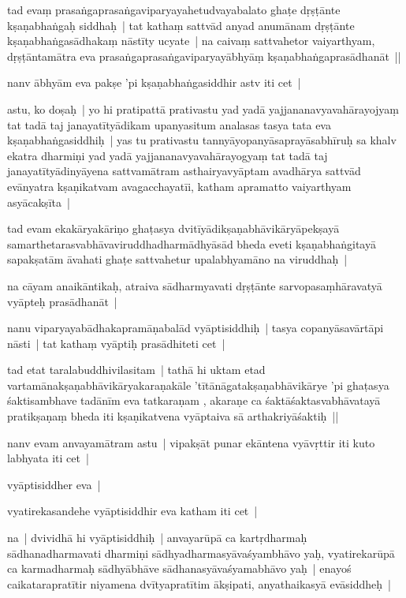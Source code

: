 \documentclass[article,12pt,a4paper]{memoir}
\begin{document}
	  \pstart tad evaṃ prasaṅgaprasaṅgaviparyayahetudvayabalato ghaṭe dṛṣṭānte kṣaṇabhaṅgaḥ siddhaḥ | tat kathaṃ sattvād anyad anumānam dṛṣṭānte kṣaṇabhaṅgasādhakaṃ nāstīty ucyate | na caivaṃ sattvahetor vaiyarthyam, dṛṣṭāntamātra eva prasaṅgaprasaṅgaviparyayābhyāṃ kṣaṇabhaṅgaprasādhanāt ||
	\pend
      

	  \pstart nanv ābhyām eva pakṣe 'pi kṣaṇabhaṅgasiddhir astv iti cet | 
	\pend
      

	  \pstart astu, ko doṣaḥ | yo hi pratipattā prativastu yad yadā yajjananavyavahārayojyaṃ tat tadā taj janayatītyādikam upanyasitum analasas tasya tata eva kṣaṇabhaṅgasiddhiḥ | yas tu prativastu tannyāyopanyāsaprayāsabhīruḥ sa khalv ekatra dharmiṇi yad yadā yajjananavyavahārayogyaṃ tat tadā taj janayatītyādinyāyena sattvamātram asthairyavyāptam avadhārya sattvād evānyatra kṣaṇikatvam avagacchayatīi, katham apramatto vaiyarthyam asyācakṣīta |
	\pend
      

	  \pstart tad evam ekakāryakāriṇo ghaṭasya dvitīyādikṣaṇabhāvikāryāpekṣayā samarthetarasvabhāvaviruddhadharmādhyāsād bheda eveti kṣaṇabhaṅgitayā sapakṣatām āvahati ghaṭe sattvahetur upalabhyamāno na viruddhaḥ | 
	\pend
      

	  \pstart na cāyam anaikāntikaḥ, atraiva sādharmyavati dṛṣṭānte sarvopasaṃhāravatyā vyāpteḥ prasādhanāt |
	\pend
      

	  \pstart nanu viparyayabādhakapramāṇabalād vyāptisiddhiḥ | tasya copanyāsavārtāpi nāsti | tat kathaṃ vyāptiḥ prasādhiteti cet | 
	\pend
      

	  \pstart tad etat taralabuddhivilasitam | tathā hi uktam etad vartamānakṣaṇabhāvikāryakaraṇakāle 'tītānāgatakṣaṇabhāvikārye 'pi ghaṭasya śaktisambhave tadānīm eva tatkaraṇam , akaraṇe ca śaktāśaktasvabhāvatayā pratikṣaṇaṃ bheda iti kṣaṇikatvena vyāptaiva sā arthakriyāśaktiḥ || 
	\pend
      

	  \pstart nanv evam anvayamātram astu | vipakṣāt punar ekāntena vyāvṛttir iti kuto labhyata iti cet | 
	\pend
      

	  \pstart vyāptisiddher eva |
	\pend
      

	  \pstart vyatirekasandehe vyāptisiddhir eva katham iti cet | 
	\pend
      

	  \pstart na | dvividhā hi vyāptisiddhiḥ | anvayarūpā ca kartṛdharmaḥ sādhanadharmavati dharmiṇi sādhyadharmasyāvaśyambhāvo yaḥ, vyatirekarūpā ca karmadharmaḥ sādhyābhāve sādhanasyāvaśyamabhāvo yaḥ | enayoś caikatarapratītir niyamena dvītyapratītim ākṣipati, anyathaikasyā evāsiddheḥ |
	\pend
      
\end{document}
